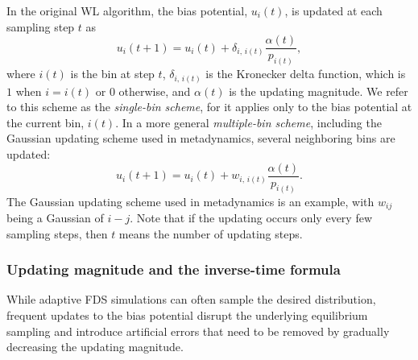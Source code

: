 \documentclass[reprint, superscriptaddress, floatfix]{revtex4-1}
\begin{document}
%
In the original WL algorithm\cite{wang2001, *wang2001pre},
the bias potential, $u_i(t)$, is updated
at each sampling step $t$ as
%
\begin{equation}
  u_i(t+1)
  =
  u_i(t)
  +
  \delta_{i, \, i(t)}
  \frac{ \alpha(t) } { p_{i(t)} }
  ,
\label{eq:wl_update}
\end{equation}
%
where $i(t)$ is the bin at step $t$,
$\delta_{i, \, i(t)}$ is the Kronecker delta function,
which is $1$ when $i = i(t)$ or $0$ otherwise,
and $\alpha(t)$ is the updating magnitude.
%
We refer to this scheme as the \emph{single-bin scheme},
for it applies only to the bias potential
at the current bin, $i(t)$.
%
In a more general \emph{multiple-bin scheme},
including the Gaussian updating scheme
used in metadynamics,
several neighboring bins are updated:
%
\begin{equation}
  u_i(t+1)
  =
  u_i(t)
  +
  w_{i, \, i(t)}
  \frac{ \alpha(t) }
       { p_{i(t)} }
  .
  \label{eq:mbin_update}
\end{equation}
%
The Gaussian updating scheme used in metadynamics
is an example, with $w_{ij}$ being a Gaussian of $i-j$.
%
Note that if the updating occurs
only every few sampling steps,
then $t$ means the number of updating steps.



\subsubsection{Updating magnitude and the inverse-time formula}



While adaptive FDS simulations
can often sample the desired distribution,
frequent updates to the bias potential
disrupt the underlying equilibrium sampling
and introduce artificial errors that need to be
removed by gradually decreasing the updating magnitude\cite{
  belardinelli2007, *belardinelli2007jcp, *belardinelli2008, *belardinelli2016,
  zhou2005, morozov2007, zhou2008,
  laio2005, bussi2006, poulain2006, liang2007,
  crespo2010, *atchade2011, *fort2015}.
%
\end{document}
